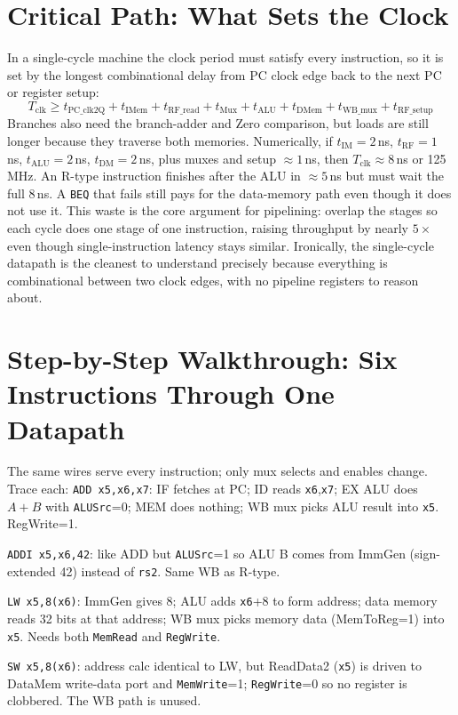 \section{Critical Path: What Sets the Clock}
In a single-cycle machine the clock period must satisfy every instruction, so it is set by the longest combinational delay from PC clock edge back to the next PC or register setup:
\[ T_{\text{clk}} \ge t_{\text{PC\_clk2Q}} + t_{\text{IMem}} + t_{\text{RF\_read}} + t_{\text{Mux}} + t_{\text{ALU}} + t_{\text{DMem}} + t_{\text{WB\_mux}} + t_{\text{RF\_setup}} \]
Branches also need the branch-adder and Zero comparison, but loads are still longer because they traverse both memories. Numerically, if $t_{\text{IM}}=2$\,ns, $t_{\text{RF}}=1$\,ns, $t_{\text{ALU}}=2$\,ns, $t_{\text{DM}}=2$\,ns, plus muxes and setup $\approx 1$\,ns, then $T_{\text{clk}}\approx 8$\,ns or 125\,MHz. An R-type instruction finishes after the ALU in $\approx 5$\,ns but must wait the full 8\,ns. A \texttt{BEQ} that fails still pays for the data-memory path even though it does not use it. This waste is the core argument for pipelining: overlap the stages so each cycle does one stage of one instruction, raising throughput by nearly $5\times$ even though single-instruction latency stays similar. Ironically, the single-cycle datapath is the cleanest to understand precisely because everything is combinational between two clock edges, with no pipeline registers to reason about.

\section{Step-by-Step Walkthrough: Six Instructions Through One Datapath}
The same wires serve every instruction; only mux selects and enables change. Trace each:
\texttt{ADD x5,x6,x7}: IF fetches at PC; ID reads \texttt{x6},\texttt{x7}; EX ALU does $A+B$ with \texttt{ALUSrc}=0; MEM does nothing; WB mux picks ALU result into \texttt{x5}. RegWrite=1.

\texttt{ADDI x5,x6,42}: like ADD but \texttt{ALUSrc}=1 so ALU B comes from ImmGen (sign-extended 42) instead of \texttt{rs2}. Same WB as R-type.

\texttt{LW x5,8(x6)}: ImmGen gives 8; ALU adds \texttt{x6}+8 to form address; data memory reads 32 bits at that address; WB mux picks memory data (MemToReg=1) into \texttt{x5}. Needs both \texttt{MemRead} and \texttt{RegWrite}.

\texttt{SW x5,8(x6)}: address calc identical to LW, but ReadData2 (\texttt{x5}) is driven to DataMem write-data port and \texttt{MemWrite}=1; \texttt{RegWrite}=0 so no register is clobbered. The WB path is unused.

